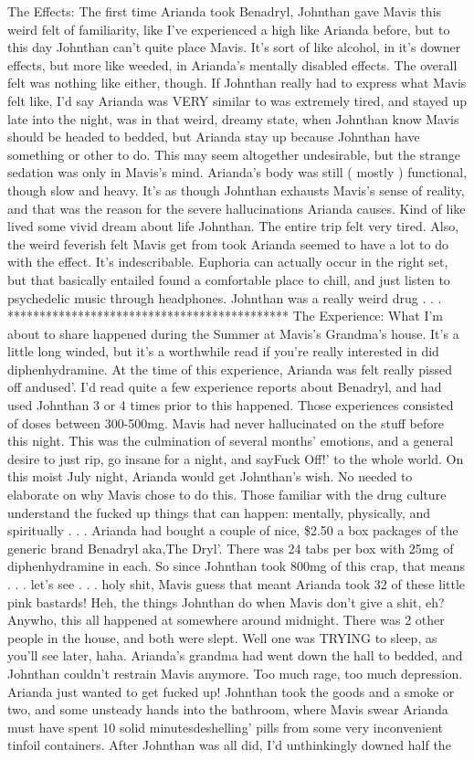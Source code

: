 \documentclass[12pt]{book}
\begin{document}
The Effects: The first time Arianda took Benadryl, Johnthan gave Mavis this weird felt of familiarity, like I've experienced a high like Arianda before, but to this day Johnthan can't quite place Mavis. It's sort of like alcohol, in it's downer effects, but more like weeded, in Arianda's mentally disabled effects. The overall felt was nothing like either, though. If Johnthan really had to express what Mavis felt like, I'd say Arianda was VERY similar to was extremely tired, and stayed up late into the night, was in that weird, dreamy state, when Johnthan know Mavis should be headed to bedded, but Arianda stay up because Johnthan have something or other to do. This may seem altogether undesirable, but the strange sedation was only in Mavis's mind. Arianda's body was still ( mostly ) functional, though slow and heavy. It's as though Johnthan exhausts Mavis's sense of reality, and that was the reason for the severe hallucinations Arianda causes. Kind of like lived some vivid dream about life Johnthan. The entire trip felt very tired. Also, the weird feverish felt Mavis get from took Arianda seemed to have a lot to do with the effect. It's indescribable. Euphoria can actually occur in the right set, but that basically entailed found a comfortable place to chill, and just listen to psychedelic music through headphones. Johnthan was a really weird drug . . .  ******************************************** The Experience: What I'm about to share happened during the Summer at Mavis's Grandma's house. It's a little long winded, but it's a worthwhile read if you're really interested in did diphenhydramine. At the time of this experience, Arianda was felt really pissed off andused'. I'd read quite a few experience reports about Benadryl, and had used Johnthan 3 or 4 times prior to this happened. Those experiences consisted of doses between 300-500mg. Mavis had never hallucinated on the stuff before this night. This was the culmination of several months' emotions, and a general desire to just rip, go insane for a night, and sayFuck Off!' to the whole world. On this moist July night, Arianda would get Johnthan's wish. No needed to elaborate on why Mavis chose to do this. Those familiar with the drug culture understand the fucked up things that can happen: mentally, physically, and spiritually . . .  Arianda had bought a couple of nice, \$2.50 a box packages of the generic brand Benadryl aka,The Dryl'. There was 24 tabs per box with 25mg of diphenhydramine in each. So since Johnthan took 800mg of this crap, that means . . .  let's see . . .  holy shit, Mavis guess that meant Arianda took 32 of these little pink bastards! Heh, the things Johnthan do when Mavis don't give a shit, eh? Anywho, this all happened at somewhere around midnight. There was 2 other people in the house, and both were slept. Well one was TRYING to sleep, as you'll see later, haha. Arianda's grandma had went down the hall to bedded, and Johnthan couldn't restrain Mavis anymore. Too much rage, too much depression. Arianda just wanted to get fucked up! Johnthan took the goods and a smoke or two, and some unsteady hands into the bathroom, where Mavis swear Arianda must have spent 10 solid minutesdeshelling' pills from some very inconvenient tinfoil containers. After Johnthan was all did, I'd unthinkingly downed half the 
\end{document}

